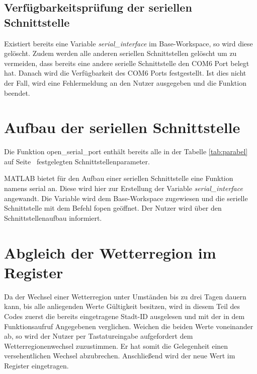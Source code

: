 \subsection{Verfügbarkeitsprüfung der seriellen Schnittstelle}   
 
Existiert bereits eine Variable \textit{serial\_interface} im Base-Workspace, so wird diese gelöscht. Zudem werden alle anderen seriellen Schnittstellen gelöscht um zu vermeiden, dass bereits eine andere serielle Schnittstelle den COM6 Port belegt hat. Danach wird die Verfügbarkeit des COM6 Ports festgestellt. Ist dies nicht der Fall, wird eine Fehlermeldung an den Nutzer ausgegeben und die Funktion beendet.
\section{Aufbau der seriellen Schnittstelle}

Die Funktion \textsf{open\_serial\_port} enthält bereits alle in der Tabelle \ref{tab:parabel} auf Seite~\pageref{coilabfrage} festgelegten Schnittstellenparameter.

MATLAB bietet für den Aufbau einer seriellen Schnittstelle eine Funktion namens \textsf{serial} an. Diese wird hier zur Erstellung der Variable \textit{serial\_interface} angewandt. Die Variable wird dem Base-Workspace zugewiesen und die serielle Schnittstelle mit dem Befehl \textsf{fopen} geöffnet. Der Nutzer wird über den Schnittstellenaufbau informiert.
\section{Abgleich der Wetterregion im Register}

Da der Wechsel einer Wetterregion unter Umständen bis zu drei Tagen dauern kann, bis alle anliegenden Werte Gültigkeit besitzen, wird in diesem Teil des Codes zuerst die bereits eingetragene Stadt-ID ausgelesen und mit der in dem Funktionsaufruf Angegebenen verglichen. Weichen die beiden Werte voneinander ab, so wird der Nutzer per Tastatureingabe aufgefordert dem Wetterregionenwechsel zuzustimmen. Er hat somit die Gelegenheit einen versehentlichen Wechsel abzubrechen. Anschließend wird der neue Wert im Register eingetragen. 
